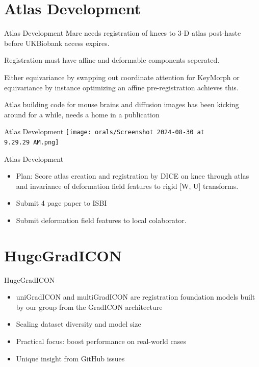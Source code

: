 \documentclass{beamer}
\begin{document}
\section{Atlas Development}
\begin{frame}{Atlas Development}
	Marc needs registration of knees to 3-D atlas post-haste before UKBiobank access expires.

	Registration must have affine and deformable components seperated.

	Either equivariance by swapping out coordinate attention for KeyMorph or equivariance by instance optimizing an affine pre-registration achieves this.

	Atlas building code for mouse brains and diffusion images has been kicking around for a while, needs a home in a publication
\end{frame}

\begin{frame}{Atlas Development}
	\texttt{[image: orals/Screenshot 2024-08-30 at 9.29.29 AM.png]}
\end{frame}
\begin{frame}{Atlas Development}
	\begin{itemize}
		\item Plan: Score atlas creation and registration by DICE on knee through atlas and invariance of deformation field features to rigid [W, U] transforms.
		\item Submit 4 page paper to ISBI
		\item Submit deformation field features to local colaborator.
	\end{itemize}
\end{frame}

\section{HugeGradICON}
 \begin{frame}{HugeGradICON}
	 \begin{itemize}
		 \item uniGradICON and multiGradICON are registration foundation models built by our group from the GradICON architecture
		 \item Scaling dataset diversity and model size
		\item Practical focus: boost performance on real-world cases
		\item Unique insight from GitHub issues
	\end{itemize}
\end{frame}
\end{document}
